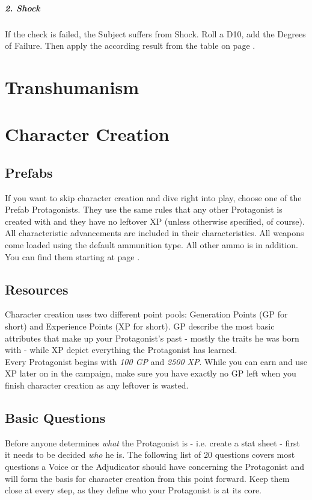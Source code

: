 \documentclass[11pt,a4paper,openany,dvipsnames]{book}
\begin{document}
	\paragraph{2. Shock}
	If the check is failed, the Subject suffers from Shock.
	Roll a D10, add the Degrees of Failure.
	Then apply the according result from the table on page \pageref{feartable}.

	\chapter{Transhumanism}
	

	\chapter{Character Creation}
	\section{Prefabs}
	If you want to skip character creation and dive right into play,
		choose one of the Prefab Protagonists.
	They use the same rules that any other Protagonist is created with
		and they have no leftover XP (unless otherwise specified, of course).
	All characteristic advancements are included in their characteristics.
	All weapons come loaded using the default ammunition type.
	All other ammo is in addition.
	\\
	You can find them starting at page \pageref{sec:pfchars}.

	\section{Resources}
	\label{sec:ccResources}
	Character creation uses two different point pools:
		Generation Points (GP for short) and Experience Points (XP for short).
	GP describe the most basic attributes that make up your Protagonist's past
		- mostly the traits he was born with -
		while XP depict everything the Protagonist has learned.
	\\%
	Every Protagonist begins with \emph{100 GP} and \emph{2500 XP}.
	While you can earn and use XP later on in the campaign,
		make sure you have exactly no GP left when you finish character creation as any leftover is wasted.

	\newpage
	\section{Basic Questions}
	Before anyone determines \emph{what} the Protagonist is
		- i.e. create a stat sheet -
		first it needs to be decided \emph{who} he is.
	The following list of 20 questions covers
		most questions a Voice or the Adjudicator should have concerning the Protagonist
		and will form the basis for character creation from this point forward.
	Keep them close at every step, as they define who your Protagonist is at its core.
\end{document}
